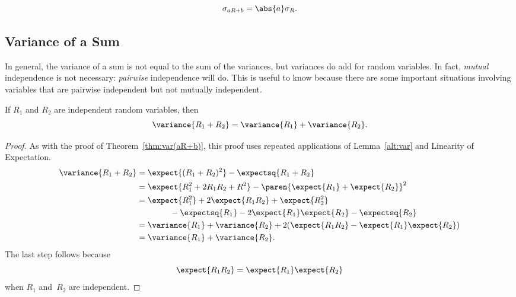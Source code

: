\begin{corollary}
\[
\sigma_{aR+b} = \abs{a}\sigma_{R}.
\]
\end{corollary}

\subsection{Variance of a Sum}

In general, the variance of a sum is not equal to the sum of the
variances, but variances do add for \emph{} random
variables.  In fact,  \emph{mutual}
independence is not necessary: 
\emph{pairwise} independence will do.  This is useful to know because
there are some important situations involving variables that are
pairwise independent but not mutually independent.

\begin{theorem}\label{indvar}
If $R_1$ and $R_2$ are independent random variables, then
\begin{equation}\label{vR+R}
\variance{R_1 + R_2} = \variance{R_1} + \variance{R_2}.
\end{equation}
\end{theorem}

\begin{proof}

As with the proof of Theorem~\ref{thm:var(aR+b)}, this proof uses
repeated applications of Lemma~\ref{alt:var} and Linearity of
Expectation.
\begin{align*}
\variance{R_1 + R_2}
    &= \expect{(R_1 + R_2)^2} - \expectsq{R_1 + R_2} \\
    &= \expect{R_1^2 + 2 R_1 R_2 + R^2}
            - \paren{\expect{R_1} + \expect{R_2}}^2 \\
    &= \expect{R_1^2} + 2 \expect{R_1 R_2} + \expect{R_2^2} \\
    &\qquad\qquad
            - \expectsq{R_1} - 2 \expect{R_1} \expect{R_2}
            - \expectsq{R_2} \\
    &= \variance{R_1} + \variance{R_2}
            + 2( \expect{R_1 R_2} - \expect{R_1} \expect{R_2} ) \\
    &= \variance{R_1} + \variance{R_2}.
\end{align*}
The last step follows because
\begin{equation*}
    \expect{R_1 R_2} = \expect{R_1} \expect{R_2}
\end{equation*}
when $R_1$ and~$R_2$ are independent.
\end{proof}

